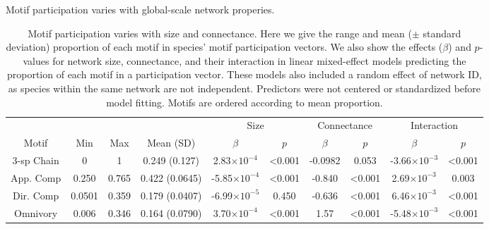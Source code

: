 \documentclass[12pt]{article}
\begin{document}
\begin{spacing}{2.0}
    Motif participation varies with global-scale network properies.
    \begin{table}[hb!]
        \centering
        \caption{Motif participation varies with size and connectance. Here we give the range and mean ($\pm$ standard deviation) proportion of each motif in species' motif participation vectors. 
        We also show the effects ($\beta$) and $p$-values for network size, connectance, and their interaction in linear mixed-effect models predicting the proportion of each motif in a participation vector.
        These models also included a random effect of network ID, as species within the same network are not independent.
        Predictors were not centered or standardized before model fitting. Motifs are ordered according to mean proportion.}
        \label{tab:partic_vs_SC}   
        \footnotesize
        \begin{tabular}{c|c c c | c c | c c | c c}
             &  &  &  & \multicolumn{2}{c}{Size} & \multicolumn{2}{|c}{Connectance} & \multicolumn{2}{|c}{Interaction} \\
            Motif & Min & Max & Mean (SD) & $\beta$ & $p$ & $\beta$ & $p$ & $\beta$ & $p$ \\
            \hline
            3-sp Chain & 0 & 1 & 0.249 (0.127) & 2.83$\times10^{-4}$ & \textless0.001 & -0.0982 & 0.053 & -3.66$\times10^{-3}$ & \textless0.001 \\
            App. Comp & 0.250 & 0.765 & 0.422 (0.0645) & -5.85$\times10^{-4}$ & \textless0.001 & -0.840 & \textless0.001 & 2.69$\times10^{-3}$ & 0.003 \\
            Dir. Comp & 0.0501 & 0.359 & 0.179 (0.0407) & -6.99$\times10^{-5}$ & 0.450 & -0.636 & \textless0.001 & 6.46$\times10^{-3}$ & \textless0.001 \\
            Omnivory & 0.006 & 0.346 & 0.164 (0.0790) & 3.70$\times10^{-4}$ & \textless0.001 & 1.57 & \textless0.001 & -5.48$\times10^{-3}$ & \textless0.001\\   
            \hline
            \end{tabular}
            \end{table}


\end{spacing}
\end{document}
